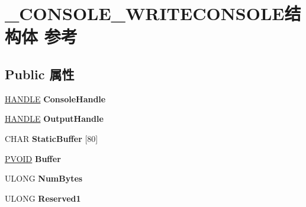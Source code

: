 \hypertarget{struct___c_o_n_s_o_l_e___w_r_i_t_e_c_o_n_s_o_l_e}{}\section{\+\_\+\+C\+O\+N\+S\+O\+L\+E\+\_\+\+W\+R\+I\+T\+E\+C\+O\+N\+S\+O\+L\+E结构体 参考}
\label{struct___c_o_n_s_o_l_e___w_r_i_t_e_c_o_n_s_o_l_e}
\subsection*{Public 属性}
\begin{DoxyCompactItemize}
\item 
\mbox{\label{struct___c_o_n_s_o_l_e___w_r_i_t_e_c_o_n_s_o_l_e_ad5f55183fffe114658d3edf99c15e6f3}} 
\hyperlink{interfacevoid}{H\+A\+N\+D\+LE} {\bfseries Console\+Handle}
\item 
\mbox{\label{struct___c_o_n_s_o_l_e___w_r_i_t_e_c_o_n_s_o_l_e_aad54750b2e799b1784095d1791cd484f}} 
\hyperlink{interfacevoid}{H\+A\+N\+D\+LE} {\bfseries Output\+Handle}
\item 
\mbox{\label{struct___c_o_n_s_o_l_e___w_r_i_t_e_c_o_n_s_o_l_e_aa3d2d221bc884c34af1db3b0a1ee482d}} 
C\+H\+AR {\bfseries Static\+Buffer} \mbox{[}80\mbox{]}
\item 
\mbox{\label{struct___c_o_n_s_o_l_e___w_r_i_t_e_c_o_n_s_o_l_e_a34d1dd944239106f030694029362908a}} 
\hyperlink{interfacevoid}{P\+V\+O\+ID} {\bfseries Buffer}
\item 
\mbox{\label{struct___c_o_n_s_o_l_e___w_r_i_t_e_c_o_n_s_o_l_e_a14b03f2d0d81d0541afc2507490af4c1}} 
U\+L\+O\+NG {\bfseries Num\+Bytes}
\item 
\mbox{\label{struct___c_o_n_s_o_l_e___w_r_i_t_e_c_o_n_s_o_l_e_a8bf03189a85ce3294b48f20e3b2118f0}} 
U\+L\+O\+NG {\bfseries Reserved1}
\item 
\mbox{\label{struct___c_o_n_s_o_l_e___w_r_i_t_e_c_o_n_s_o_l_e_aad3b80062d8f401d469dcd1334bd1996}} 

\end{DoxyCompactItemize}
